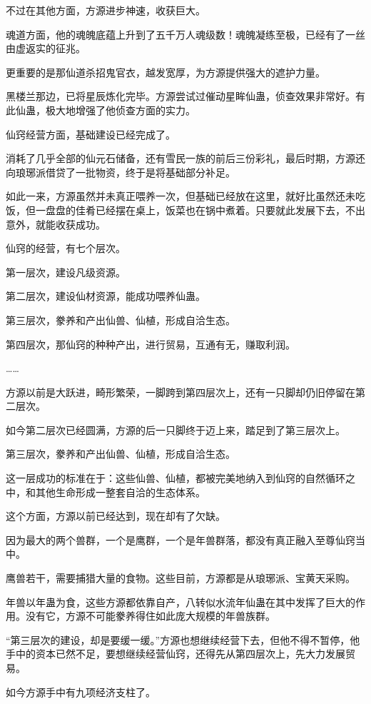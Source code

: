 \begin{this_body}
不过在其他方面，方源进步神速，收获巨大。

魂道方面，他的魂魄底蕴上升到了五千万人魂级数！魂魄凝练至极，已经有了一丝由虚返实的征兆。

更重要的是那仙道杀招鬼官衣，越发宽厚，为方源提供强大的遮护力量。

黑楼兰那边，已将星辰炼化完毕。方源尝试过催动星眸仙蛊，侦查效果非常好。有此仙蛊，极大地增强了他侦查方面的实力。

仙窍经营方面，基础建设已经完成了。

消耗了几乎全部的仙元石储备，还有雪民一族的前后三份彩礼，最后时期，方源还向琅琊派借贷了一批物资，终于是将基础部分补足。

如此一来，方源虽然并未真正喂养一次，但基础已经放在这里，就好比虽然还未吃饭，但一盘盘的佳肴已经摆在桌上，饭菜也在锅中煮着。只要就此发展下去，不出意外，就能收获成功。

仙窍的经营，有七个层次。

第一层次，建设凡级资源。

第二层次，建设仙材资源，能成功喂养仙蛊。

第三层次，豢养和产出仙兽、仙植，形成自洽生态。

第四层次，那仙窍的种种产出，进行贸易，互通有无，赚取利润。

……

方源以前是大跃进，畸形繁荣，一脚跨到第四层次上，还有一只脚却仍旧停留在第二层次。

如今第二层次已经圆满，方源的后一只脚终于迈上来，踏足到了第三层次上。

第三层次，豢养和产出仙兽、仙植，形成自洽生态。

这一层成功的标准在于：这些仙兽、仙植，都被完美地纳入到仙窍的自然循环之中，和其他生命形成一整套自洽的生态体系。

这个方面，方源以前已经达到，现在却有了欠缺。

因为最大的两个兽群，一个是鹰群，一个是年兽群落，都没有真正融入至尊仙窍当中。

鹰兽若干，需要捕猎大量的食物。这些目前，方源都是从琅琊派、宝黄天采购。

年兽以年蛊为食，这些方源都依靠自产，八转似水流年仙蛊在其中发挥了巨大的作用。没有它，方源不可能豢养得住如此庞大规模的年兽族群。

“第三层次的建设，却是要缓一缓。”方源也想继续经营下去，但他不得不暂停，他手中的资本已然不足，要想继续经营仙窍，还得先从第四层次上，先大力发展贸易。

如今方源手中有九项经济支柱了。


\end{this_body}
